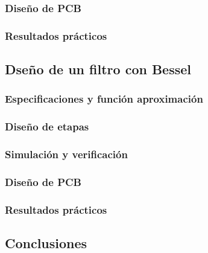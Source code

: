 \subsubsection{Dise\~no de PCB}

\subsubsection{Resultados pr\'acticos}

\subsection{Dse\~no de un filtro con Bessel}

\subsubsection{Especificaciones y funci\'on aproximaci\'on}

\subsubsection{Dise\~no de etapas}

\subsubsection{Simulaci\'on y verificaci\'on}

\subsubsection{Dise\~no de PCB}

\subsubsection{Resultados pr\'acticos}

\subsection{Conclusiones}